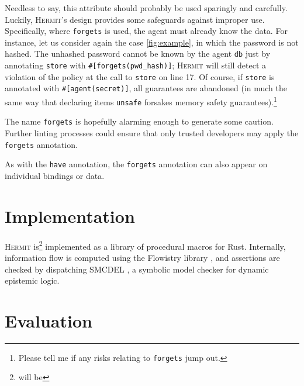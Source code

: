 \documentclass[letterpaper,twocolumn,10pt]{article}
\newcommand{\Hermit}{\textsc{Hermit}}
\begin{document}
Needless to say, this attribute should probably be used sparingly and carefully. Luckily, \Hermit's
design provides some safeguards against improper use. Specifically, where \lstinline{forgets} is
used, the agent must already know the data. For instance, let us consider again the case
\cref{fig:example}, in which the password is not hashed. The unhashed password cannot be known by
the agent \lstinline{db} just by annotating \lstinline{store} with \lstinline{#[forgets(pwd_hash)]};
\Hermit{} will still detect a violation of the policy at the call to \lstinline{store} on line 17.
Of course, if \lstinline{store} is annotated with \lstinline{#[agent(secret)]}, all guarantees are
abandoned (in much the same way that declaring items \lstinline{unsafe} forsakes memory safety
guarantees).\footnote{Please tell me if any risks relating to \lstinline{forgets} jump out.}

The name \lstinline{forgets} is hopefully alarming enough to generate some caution. Further linting
processes could ensure that only trusted developers may apply the \lstinline{forgets} annotation.

As with the \lstinline{have} annotation, the \lstinline{forgets} annotation can also appear on
individual bindings or data.





\section{Implementation}

\Hermit{} is\footnote{will be} implemented as a library of procedural macros for Rust. Internally,
information flow is computed using the Flowistry library \cite{crichton_2022a}, and assertions are
checked by dispatching SMCDEL \cite{gattinger_2018a}, a symbolic model checker for dynamic epistemic
logic.

\section{Evaluation}



\end{document}
